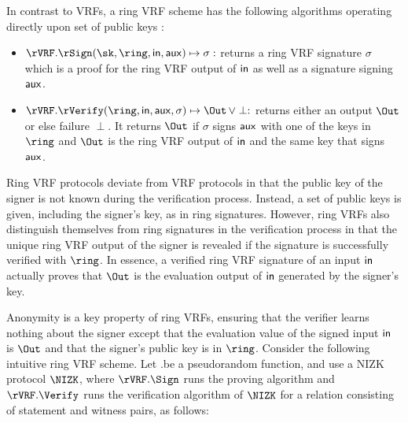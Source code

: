 In contrast to VRFs, a ring VRF scheme has the following algorithms operating directly upon
 set of public keys \ring:
\begin{itemize}
\item $\rVRF.\rSign(\sk,\ring,\msg, \aux) \mapsto \sigma:$
    returns a ring VRF signature $\sigma$ which is a proof for the ring VRF output of $ \mathsf{in} $ as well as a signature signing $ \mathsf{aux} $.
\item $\rVRF.\rVerify(\ring,\msg,\aux,\sigma) \mapsto \Out \, \lor \perp:$
    returns either an output $\Out$ or else failure $\perp$. It returns $ \Out $ if $ \sigma  $ signs $ \mathsf{aux} $ with one of the keys in $ \ring $ and $ \Out $ is the ring VRF output of $ \mathsf{in} $ and the same key that signs $ \mathsf{aux} $.
\end{itemize}


Ring VRF protocols deviate from VRF protocols in that the public key of the signer is not known during the verification process. Instead, a set of public keys is given, including the signer's key, as in ring signatures. However, ring VRFs also distinguish themselves from ring signatures  in the verification process in that the unique ring VRF output of the signer is revealed if the signature is successfully verified with $\ring$. 
In essence, a verified ring VRF signature of an input  $ \mathsf{in} $ actually proves that $ \Out $ is the evaluation output of $ \mathsf{in} $ generated by the signer's key. 

Anonymity is a key property of ring VRFs, ensuring that the verifier learns nothing about the signer except that the  evaluation value of the signed input $ \mathsf{in} $ is $ \Out $ and that the signer's public key is in $ \ring $.
Consider the following intuitive ring VRF scheme.
Let \rVRF.\Eval be a pseudorandom function, and use a NIZK protocol $ \NIZK $, where $ \rVRF.\Sign $ runs the proving algorithm and $ \rVRF.\Verify $ runs the verification algorithm of $ \NIZK $ for a relation consisting of statement and witness pairs, as follows:



